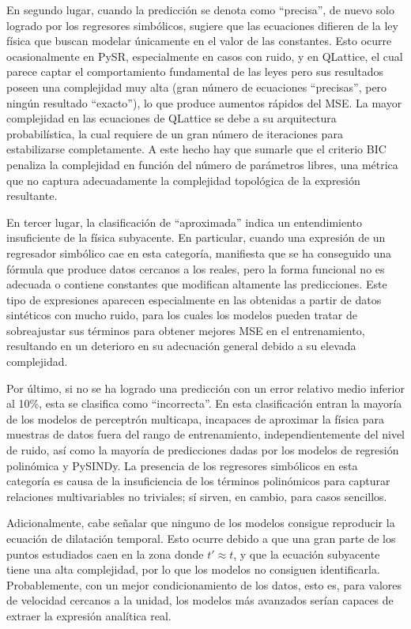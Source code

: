 \documentclass[11pt, a4paper]{article}
\begin{document}
En segundo lugar, cuando la predicción se denota como ``precisa'', de nuevo solo logrado por los regresores simbólicos, sugiere que las ecuaciones difieren de la ley física que buscan modelar únicamente en el valor de las constantes. Esto ocurre ocasionalmente en PySR, especialmente en casos con ruido, y en QLattice, el cual parece captar el comportamiento fundamental de las leyes pero sus resultados poseen una complejidad muy alta (gran número de ecuaciones ``precisas'', pero ningún resultado ``exacto''), lo que produce aumentos rápidos del MSE. La mayor complejidad en las ecuaciones de QLattice se debe a su arquitectura probabilística, la cual requiere de un gran número de iteraciones para estabilizarse completamente. A este hecho hay que sumarle que el criterio BIC penaliza la complejidad en función del número de parámetros libres, una métrica que no captura adecuadamente la complejidad topológica de la expresión resultante.

En tercer lugar, la clasificación de ``aproximada'' indica un entendimiento insuficiente de la física subyacente. En particular, cuando una expresión de un regresador simbólico cae en esta categoría, manifiesta que se ha conseguido una fórmula que produce datos cercanos a los reales, pero la forma funcional no es adecuada o contiene constantes que modifican altamente las predicciones. Este tipo de expresiones aparecen especialmente en las obtenidas a partir de datos sintéticos con mucho ruido, para los cuales los modelos pueden tratar de sobreajustar sus términos para obtener mejores MSE en el entrenamiento, resultando en un deterioro en su adecuación general debido a su elevada complejidad.

Por último, si no se ha logrado una predicción con un error relativo medio inferior al 10\%, esta se clasifica como ``incorrecta''. En esta clasificación entran la mayoría de los modelos de perceptrón multicapa, incapaces de aproximar la física para muestras de datos fuera del rango de entrenamiento, independientemente del nivel de ruido, así como la mayoría de predicciones dadas por los modelos de regresión polinómica y PySINDy. La presencia de los regresores simbólicos en esta categoría es causa de la insuficiencia de los términos polinómicos para capturar relaciones multivariables no triviales; sí sirven, en cambio, para casos sencillos. 

Adicionalmente, cabe señalar que ninguno de los modelos consigue reproducir la ecuación de dilatación temporal. Esto ocurre debido a que una gran parte de los puntos estudiados caen en la zona donde $t'\approx t$, y que la ecuación subyacente tiene una alta complejidad, por lo que los modelos no consiguen identificarla. Probablemente, con un mejor condicionamiento de los datos, esto es, para valores de velocidad cercanos a la unidad, los modelos más avanzados serían capaces de extraer la expresión analítica real.
\end{document}
